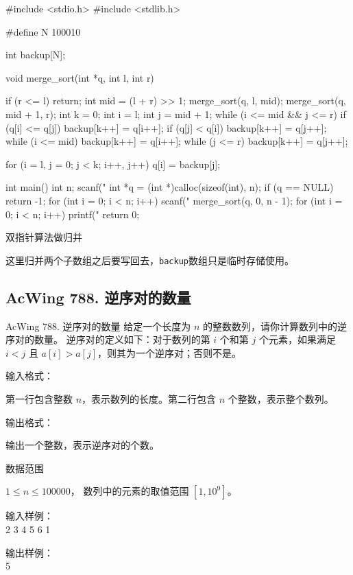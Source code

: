 \begin{mycpptwocol}
#include <stdio.h>
#include <stdlib.h>

#define N 100010

int backup[N];

void merge_sort(int *q, int l, int r)
{
    if (r <= l) {
        return;
    }
    int mid = (l + r) >> 1;
    merge_sort(q, l, mid);
    merge_sort(q, mid + 1, r);
    int k = 0;
    int i = l;
    int j = mid + 1;
    while (i <= mid && j <= r) {
        if (q[i] <= q[j]) {
            backup[k++] = q[i++];
        }
        if (q[j] < q[i]) {
            backup[k++] = q[j++];
        }
    }
    while (i <= mid) {
        backup[k++] = q[i++];
    }
    while (j <= r) {
        backup[k++] = q[j++];
    }
    
    for (i = l, j = 0; j < k; i++, j++) {
        q[i] = backup[j];
    }
}

int main()
{
    int n;
    scanf("%
    int *q = (int *)calloc(sizeof(int), n);
    if (q == NULL) {
        return -1;
    }
    for (int i = 0; i < n; i++) {
        scanf("%
    }
    merge_sort(q, 0, n - 1);
    for (int i = 0; i < n; i++) {
        printf("%
    }
    return 0;
}
\end{mycpptwocol}

双指针算法做归并

\begin{keypoint}
    这里归并两个子数组之后要写回去，\lstinline{backup}数组只是临时存储使用。
\end{keypoint}

\subsection{AcWing 788. 逆序对的数量}
\begin{titledbox}{AcWing 788. 逆序对的数量}
    给定一个长度为 $n$ 的整数数列，请你计算数列中的逆序对的数量。
    逆序对的定义如下：对于数列的第 $i$ 个和第 $j$ 个元素，如果满足 $i < j$ 且 $a[i] > a[j]$，则其为一个逆序对；否则不是。
    
    输入格式：

    第一行包含整数 $n$，表示数列的长度。第二行包含 $n$ 个整数，表示整个数列。
    
    输出格式：
    
    输出一个整数，表示逆序对的个数。

    数据范围

    $1 \le n \le 100000$，
    数列中的元素的取值范围 $[1,10^9]$。
    
    \begin{minipage}[t]{.5\textwidth}
        输入样例：\\
        2 3 4 5 6 1
        \end{minipage}%
        \begin{minipage}[t]{.5\textwidth}
        输出样例：\\
        5
    \end{minipage}
\end{titledbox}

